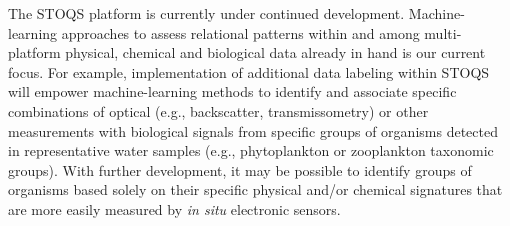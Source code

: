 \documentclass[conference]{IEEEtran}
\begin{document}
The STOQS platform is currently under continued development.  Machine-learning approaches to assess relational patterns within and among multi-platform physical, chemical and biological data already in hand is our current focus.  For example, implementation of additional data labeling within STOQS will empower machine-learning methods to identify and associate specific combinations of optical (e.g., backscatter, transmissometry) or other measurements with biological signals from specific groups of organisms detected in representative water samples (e.g., phytoplankton or zooplankton taxonomic groups). With further development, it may be possible to identify groups of organisms based solely on their specific physical and/or chemical signatures that are more easily measured by \textit{in situ} electronic sensors.






%
%



%
%
\end{document}
